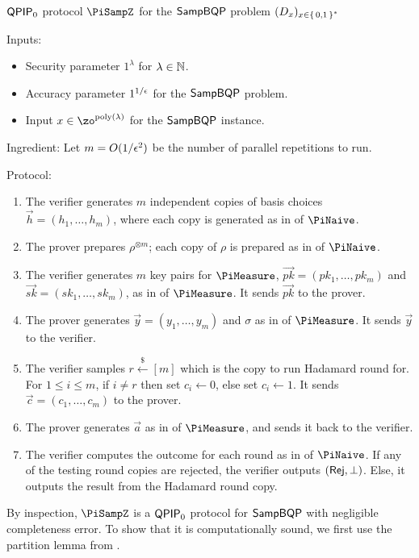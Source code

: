 \begin{protocol}{$\operatorname{\mathsf{QPIP}}_0$ protocol $\PiSampZ$ for the $\operatorname{\mathsf{SampBQP}}$ problem $(D_x)_{x\in\set{0, 1}^*}$}
	\label{proto:QPIP0samp}

	Inputs:
	\begin{itemize}
		\item Security parameter $1^\lambda$ for $\lambda\in\mathbb{N}$.
		\item Accuracy parameter $1^{1/\epsilon}$ for the $\operatorname{\mathsf{SampBQP}}$ problem.
		\item Input $x\in\zo^{\poly(\lambda)}$ for the $\operatorname{\mathsf{SampBQP}}$ instance.
	\end{itemize}

	Ingredient: Let $m=O(1/\epsilon^2)$ be the number of parallel repetitions to run.
\bigskip 

	Protocol:
	\begin{enumerate}
		\item  The verifier  generates $m$ independent copies of basis choices $\vec{h}=(h_1,\ldots,h_m)$, where each copy is generated as in  of $\PiNaive$.
		\item The prover prepares $\rho^{\otimes m}$; each copy of $\rho$ is prepared as in  of $\PiNaive$.
		\item \label{step:urmila-in-qpip0-1} The verifier generates $m$ key pairs for $\PiMeasure$, $\vec{pk}=(pk_1,\ldots,pk_m)$ and $\vec{sk}=(sk_1,\ldots,sk_m)$, as in  of $\PiMeasure$.
			It sends $\vec{pk}$ to the prover.
		\item \label{step:urmila-in-qpip0-2}The prover generates $\vec{y}=(y_1,\ldots,y_m)$ and $\sigma$ as in  of $\PiMeasure$.
			It sends $\vec{y}$ to the verifier.
		\item \label{step:urmila-in-qpip0-3}The verifier samples $r\xleftarrow{\$}[m]$ which is the copy to run Hadamard round for.
			For $1\leq i\leq m$, if $i\ne r$ then set $c_i\leftarrow 0$, else set $c_i\leftarrow 1$.
			It sends $\vec{c}=(c_1,\ldots,c_m)$ to the prover.
		\item \label{step:urmila-in-qpip0-4}The prover generates $\vec{a}$ as in  of $\PiMeasure$, and sends it back to the verifier.
		\item The verifier computes the outcome for each round as in  of $\PiNaive$.
			If any of the testing round copies are rejected, the verifier outputs $(\mathsf{Rej}, \bot)$.
			Else, it outputs the result from the Hadamard round copy.
	\end{enumerate}
\end{protocol}
By inspection, $\PiSampZ$ is a $\operatorname{\mathsf{QPIP}}_0$ protocol for $\operatorname{\mathsf{SampBQP}}$ with negligible completeness error.
To show that it is computationally sound, we first use the partition lemma from \cite{arXiv:ChiaChungYam19}.

